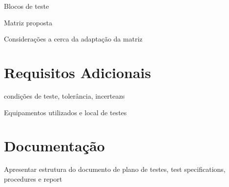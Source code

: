 Blocos de teste

Matriz proposta

Considerações a cerca da adaptação da matriz

\section{Requisitos Adicionais}

condições de teste, tolerância, incerteazs

Equipamentos utilizados e local de testes


\section{Documentação}

Apresentar estrutura do documento de plano de testes, test specifications, procedures e report
